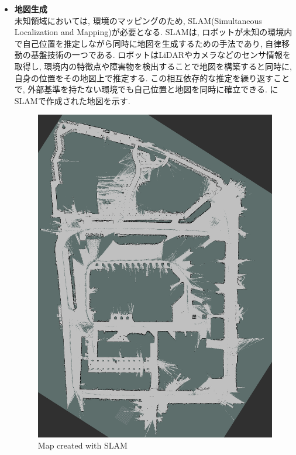 \begin{itemize}
     \item \textbf{地図生成}\\
     未知領域においては, 環境のマッピングのため, SLAM(Simultaneous Localization and Mapping)が必要となる. 
     SLAMは, ロボットが未知の環境内で自己位置を推定しながら同時に地図を生成するための手法であり, 
     自律移動の基盤技術の一つである. ロボットはLiDARやカメラなどのセンサ情報を取得し, 環境内の特徴点や障害物を検出することで地図を構築すると同時に, 
     自身の位置をその地図上で推定する. この相互依存的な推定を繰り返すことで, 外部基準を持たない環境でも自己位置と地図を同時に確立できる. 
     にSLAMで作成された地図を示す. 
     \begin{figure}[hbtp]
     \centering
          \includegraphics[keepaspectratio, scale=0.25]
           {images/slam_toolbox.png}
          \caption{Map created with SLAM}
          \label{Fig:Map}
     \end{figure}


\end{itemize}
